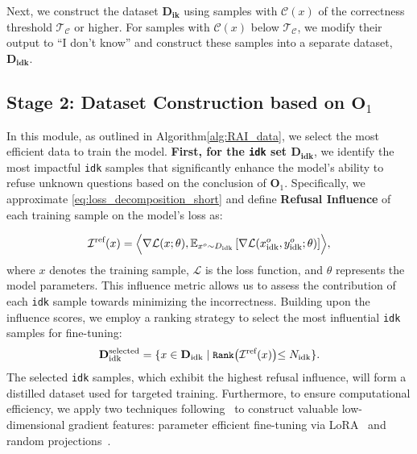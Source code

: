 Next, we construct the dataset \(\mathbf{D_{\text{ik}}}\) using samples with \(\mathcal{C}(x)\) of the correctness threshold $\mathcal{T}_{\mathcal{C}}$ or higher. For samples with \(\mathcal{C}(x)\) below $\mathcal{T}_{\mathcal{C}}$, we modify their output to ``I don't know'' and construct these samples into a separate dataset, \(\mathbf{D_{\text{idk}}}\).



\subsection{Stage 2: Dataset Construction based on  $\mathbf{O}_1$}
In this module, as outlined in Algorithm\ref{alg:RAI_data}, we select the most efficient data to train the model. \textbf{First, for the \texttt{idk} set $\mathbf{D_{\text{idk}}}$}, we identify the most impactful \texttt{idk} samples that significantly enhance the model's ability to refuse unknown questions based on the conclusion of $\mathbf{O}_1$. Specifically, we approximate \eqref{eq:loss_decomposition_short} and define \textbf{Refusal Influence} of each training sample on the model’s loss as:

\begin{equation} 
\label{eq} 
\small 
\mathcal{I}^{\text{ref}}(x) = \Bigl \langle \nabla \mathcal{L}(x; \theta), \mathbb{E}_{x^{o} \sim D_{\text{idk}}} \left[ \nabla \mathcal{L}(x^{o}_{\text{idk}}, y^{o}_{\text{idk}}; \theta) \right] \Bigr \rangle,
\end{equation}
where \(x\) denotes the training sample, \(\mathcal{L}\) is the loss function, and \(\theta\) represents the model parameters. This influence metric allows us to assess the contribution of each \texttt{idk} sample towards minimizing the incorrectness.
Building upon the influence scores, we employ a ranking strategy to select the most influential \texttt{idk} samples for fine-tuning:
\begin{equation}
\small
\label{eq:selected}
\mathbf{D_{\text{idk}}^{\text{selected}}} = \{ x \in \mathbf{D_{\text{idk}}} \mid \texttt{Rank}\bigl( \mathcal{I}^{\text{ref}}(x) \bigl) \leq N_{\text{idk}} \}.
\end{equation}
The selected \texttt{idk} samples, which exhibit the highest refusal influence, will form a distilled dataset used for targeted training.
Furthermore, to ensure computational efficiency, we apply two techniques following~\cite{Xia_Malladi_Gururangan_Arora_Chen} to construct valuable low-dimensional gradient features: parameter efficient fine-tuning via LoRA~\cite{hu2021lora} and random projections~\cite{projection}.

